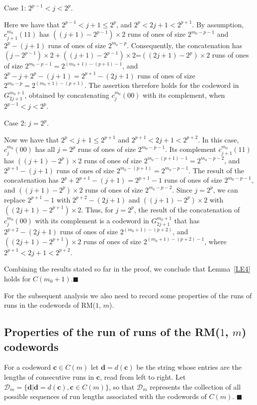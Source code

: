 \begin{itemize}
Case 1: $2^{p-1} < j < 2^{p}$.

Here we have that $2^{p-1} < j+1 \leq 2^{p}$, and $2^{p} < 2j+1 <
2^{p+1}$. By assumption, $c_{j+1}^{m_0}(11)$ has
$((j+1)-2^{p-1})\times 2$ runs of ones of size $2^{m_0-p-1}$ and
$2^{p}-(j+1)$ runs of ones of size $2^{m_0-p}$. Consequently, the
concatenation has $(j-2^{p-1})\times 2 +((j+1)-2^{p-1})\times
2$=$((2j+1)-2^{p})\times 2$ runs of ones of size
$2^{m_0-p-1}=2^{(m_0+1)-(p+1)-1}$, and
$2^{p}-j+2^{p}-(j+1)=2^{p+1}-(2j+1)$ runs of ones of size
$2^{m_0-p}=2^{(m_0+1)-(p+1)}$. The assertion therefore holds for
the codeword in $G_{2j+1}^{m_0+1}$, obtained by concatenating
$c_j^{m_0}(00)$ with its complement, when $2^{p-1} < j < 2^{p}$.

Case 2: $j=2^{p}$.

Now we have that $2^{p}< j+1 \leq 2^{p+1}$ and $2^{p+1} < 2j+1 <
2^{p+2}$. In this case, $c_{j}^{m_0}(00)$ has all $j=2^p$ runs of
ones of size $2^{m_0-p-1}$. Its complement $c_{j+1}^{m_0}(11)$ has
$((j+1)-2^{p})\times 2$ runs of ones of size
$2^{m_0-(p+1)-1}=2^{m_0-p-2}$, and $2^{p+1}-(j+1)$ runs of ones of
size $2^{m_0-(p+1)}=2^{m_0-p-1}$. The result of the concatenation
has $2^p+2^{p+1}-(j+1)=2^{p+1}-1$ runs of ones of size
$2^{m_0-p-1}$, and $((j+1)-2^{p})\times 2$ runs of ones of size
$2^{m_0-p-2}$. Since $j=2^p$, we can replace $2^{p+1}-1$ with
$2^{p+2}-(2j+1)$ and $((j+1)-2^{p})\times 2$ with
$((2j+1)-2^{p+1})\times2$. Thus, for $j=2^p$, the result of the
concatenation of $c_{j}^{m_0}(00)$ with its complement is a
codeword in $G_{2j+1}^{m_0+1}$ that has $2^{p+2}-(2j+1)$ runs of
ones of size $2^{(m_0+1)-(p+2)}$, and $((2j+1)-2^{p+1})\times 2$
runs of ones of size $2^{(m_0+1)-(p+2)-1}$, where $2^{p+1} < 2j+1
< 2^{p+2}$.
\end{itemize}
Combining the results stated so far in the proof, we conclude that
Lemma~\ref{LE4} holds for $C(m_0+1)$.\hfill $\blacksquare$

For the subsequent analysis we also need to record some properties
of the runs of runs in the codewords of RM($1$, $m$).

\subsection{Properties of the run of runs of the RM($1$, $m$)
codewords}\label{sectionRM22}

\begin{definition}  \label{de11}
For a codeword $\mathbf{c} \in C(m)$ let $\mathbf{d}=d(\mathbf{c})$ be the
string whose entries are the lengths of consecutive runs in
$\mathbf{c}$, read from left to right.
Let $\mathcal{D}_m = \{\mathbf{d} | \mathbf{d}=d(\mathbf{c}),\mathbf{c} \in
C(m)\}$,
so that $\mathcal{D}_m$ represents the collection of all possible sequences of
run
lengths associated with the codewords of $C(m)$.
\hfill $\blacksquare$
\end{definition}

